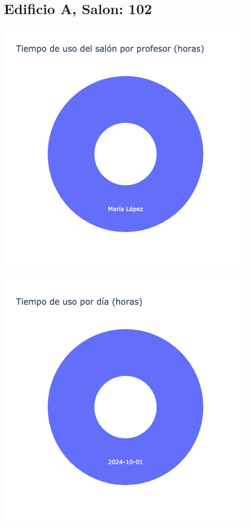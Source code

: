 \documentclass{article}
\begin{document}
    \section{Edificio A, Salon: 102}
    \noindent
    \begin{minipage}{0.48\textwidth}
        \centering
        \includegraphics[width=\textwidth]{../img/pie/UP102-90Dias-03-12-2024.png}
    \end{minipage}
    \hfill
    \begin{minipage}{0.48\textwidth}
        \centering
        \includegraphics[width=\textwidth]{../img/pie/UD102-90Dias-03-12-2024.png}
    \end{minipage}
    
\end{document}
